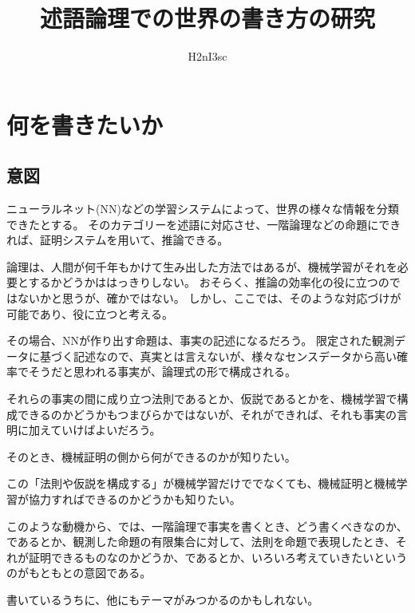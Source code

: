 \documentclass[10pt, oneside]{jarticle}   	%
\title{述語論理での世界の書き方の研究}
\author{H2nI3sc}
\theoremstyle{definition}
\begin{document}
\maketitle

\section{何を書きたいか}
\subsection{意図}
ニューラルネット(NN)などの学習システムによって、世界の様々な情報を分類できたとする。
そのカテゴリーを述語に対応させ、一階論理などの命題にできれば、証明システムを用いて、推論できる。

論理は、人間が何千年もかけて生み出した方法ではあるが、機械学習がそれを必要とするかどうかははっきりしない。
おそらく、推論の効率化の役に立つのではないかと思うが、確かではない。
しかし、ここでは、そのような対応づけが可能であり、役に立つと考える。

その場合、NNが作り出す命題は、事実の記述になるだろう。
限定された観測データに基づく記述なので、真実とは言えないが、様々なセンスデータから高い確率でそうだと思われる事実が、論理式の形で構成される。

それらの事実の間に成り立つ法則であるとか、仮説であるとかを、機械学習で構成できるのかどうかもつまびらかではないが、それができれば、それも事実の言明に加えていけばよいだろう。

そのとき、機械証明の側から何ができるのかが知りたい。

この「法則や仮説を構成する」が機械学習だけででなくても、機械証明と機械学習が協力すればできるのかどうかも知りたい。

このような動機から、では、一階論理で事実を書くとき、どう書くべきなのか、であるとか、観測した命題の有限集合に対して、法則を命題で表現したとき、それが証明できるものなのかどうか、であるとか、いろいろ考えていきたいというのがもともとの意図である。

書いているうちに、他にもテーマがみつかるのかもしれない。
\end{document}
